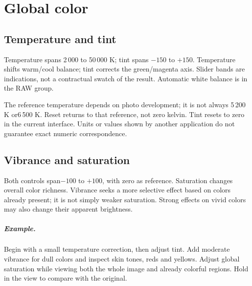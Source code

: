 \chapter{Global color}
\section{Temperature and tint}
Temperature spans 2\,000 to 50\,000 K; tint spans $-150$ to  $+150$.
Temperature shifts warm/cool balance; tint corrects the green/magenta axis.
Slider bands are indications, not a contractual swatch of the result.
Automatic white balance is in the RAW group.

The reference temperature depends on photo development; it is not always
5\,200 K or6\,500 K. Reset returns to that reference, not zero kelvin.
Tint resets to zero in the current interface. Units or values shown by
another application do not guarantee exact numeric correspondence.

\section{Vibrance and saturation}
Both controls span$-100$ to  $+100$, with zero as reference. Saturation changes
overall color richness. Vibrance seeks a more selective effect based on
colors already present; it is not simply weaker saturation. Strong effects
on vivid colors may also change their apparent brightness.

\paragraph{Example.}
Begin with a small temperature correction, then adjust tint. Add moderate
vibrance for dull colors and inspect skin tones, reds and yellows.
Adjust global saturation while viewing both the whole image and already
colorful regions. Hold  in the view to compare with the original.

\gestesreglages
